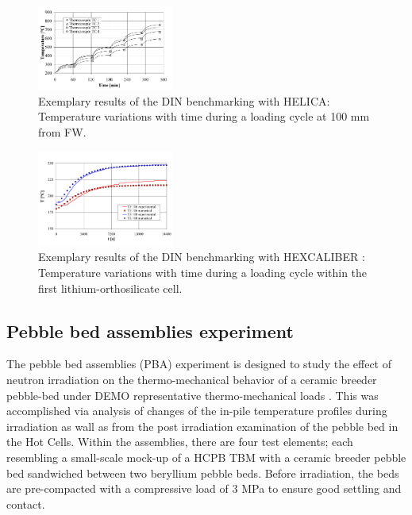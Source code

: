 \begin{figure}[t!]
\begin{center}
\includegraphics[width=0.4\textwidth]{chapters/figures/Fig-8}
\caption{Exemplary results of the DIN benchmarking with HELICA: Temperature variations with time during a loading cycle at 100 mm from FW\cite{DellOrco:2007hc}.}
\label{fig:DIN_HELICA}
\end{center}
\end{figure}


 \begin{figure}[t!]
\begin{center}
\includegraphics[width=0.4\textwidth]{chapters/figures/Fig-9}
\caption{Exemplary results of the DIN benchmarking with HEXCALIBER : Temperature variations with time during a loading cycle within the first lithium-orthosilicate cell\cite{DellOrco:2010zr}.}
\label{fig:DIN_HEX}
\end{center}
\end{figure}



\subsection{Pebble bed assemblies experiment}
The pebble bed assemblies (PBA) experiment is designed to study the effect of neutron irradiation on the thermo-mechanical behavior of a ceramic breeder pebble-bed under DEMO representative thermo-mechanical loads \cite{Magielsen2007,magielsen2005,sander2011}. This was accomplished via analysis of changes of the in-pile temperature profiles during irradiation as wall as from the post irradiation examination of the pebble bed in the Hot Cells. Within the assemblies, there are four test elements; each resembling a small-scale mock-up of a HCPB TBM with a ceramic breeder pebble bed sandwiched between two beryllium pebble beds. Before irradiation, the beds are pre-compacted with a compressive load of 3 MPa to ensure good settling and contact.  

